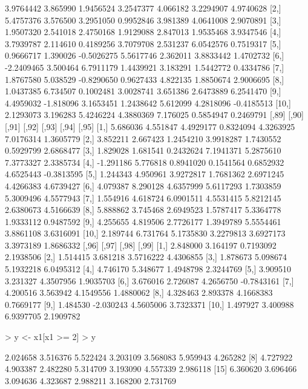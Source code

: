 \documentclass[12pt]{article}
\begin{document}
\begin{Schunk}
\begin{Soutput}
           [,82]     [,83]      [,84]     [,85]    [,86]     [,87]      [,88]
 [1,]  3.9764442  3.865990  1.9456524 3.2547377 4.066182 3.2294907  4.9740628
 [2,]  5.4757376  3.576500  3.2951050 0.9952846 3.981389 4.0641008  2.9070891
 [3,]  1.9507320  2.541018  2.4750168 1.9129088 2.847013 1.9535468  3.9347546
 [4,]  3.7939787  2.114610  0.4189256 3.7079708 2.531237 6.0542576  0.7519317
 [5,]  0.9666717  1.390026 -0.5026275 5.5617746 2.362011 3.8833442  1.4702732
 [6,] -2.2409465  3.500464  6.7911179 1.4439921 3.183291 1.5442772  0.4334786
 [7,]  1.8767580  5.038529 -0.8290650 0.9627433 4.822135 1.8850674  2.9006695
 [8,]  1.0437385  6.734507  0.1002481 3.0028741 3.651386 2.6473889  6.2541470
 [9,]  4.4959032 -1.818096  3.1653451 1.2438642 5.612099 4.2818096 -0.4185513
[10,]  2.1293073  3.196283  5.4246224 4.3880369 7.176025 0.5854947  0.2469791
          [,89]    [,90]     [,91]     [,92]     [,93]     [,94]      [,95]
 [1,]  5.686036 4.551847 4.4929177 0.8324094 4.3263925 7.0176314  1.3605779
 [2,]  3.852211 2.667423 1.2454210 3.9918287 1.7430552 0.5929799  2.6868477
 [3,]  1.829028 1.681541 0.2432624 7.1941371 5.2875610 7.3773327  2.3385734
 [4,] -1.291186 5.776818 0.8941020 0.1541564 0.6852932 4.6525443 -0.3813595
 [5,]  1.244343 4.950961 3.9272817 1.7681362 2.6971245 4.4266383  4.6739427
 [6,]  4.079387 8.290128 4.6357999 5.6117293 1.7303859 5.3009496  4.5577943
 [7,]  1.554916 4.618724 6.0901511 4.5531415 5.8212145 2.6380673  4.5166639
 [8,]  5.888862 3.745468 2.6949523 1.5787417 5.3364778 1.9333112  0.9487592
 [9,]  4.255655 4.819506 2.7726177 1.3949789 5.5554461 3.8861108  3.6316091
[10,]  2.189744 6.731764 5.1735830 3.2279813 3.6927173 3.3973189  1.8686332
         [,96]     [,97]     [,98]      [,99]
 [1,] 2.848000  3.164197 0.7193092  2.1938506
 [2,] 1.514415  3.681218 3.5716222  4.4306855
 [3,] 1.878673  5.098674 5.1932218  6.0495312
 [4,] 4.746170  5.348677 1.4948798  2.3244769
 [5,] 3.909510  3.231327 4.3507956  1.9035703
 [6,] 3.676016  2.726087 4.2656750 -0.7843161
 [7,] 4.200516  3.563942 4.1549556  1.4880062
 [8,] 4.328463  2.893378 4.1668383  0.7669177
 [9,] 1.484530 -2.030243 4.5605006  3.7323371
[10,] 1.497927  3.400988 6.9397705  2.1909782
\end{Soutput}
\begin{Sinput}
> y <- x1[x1 >= 2] 
> y
\end{Sinput}
\begin{Soutput}
  [1]  2.024658  3.516376  5.522424  3.203109  3.568083  5.959943  4.265282
  [8]  4.727922  4.903387  2.482280  5.314709  3.193090  4.557339  2.986118
 [15]  6.360620  3.696466  3.094636  4.323687  2.988211  3.168200  2.731769

\end{Soutput}
\end{Schunk}
\end{document}
